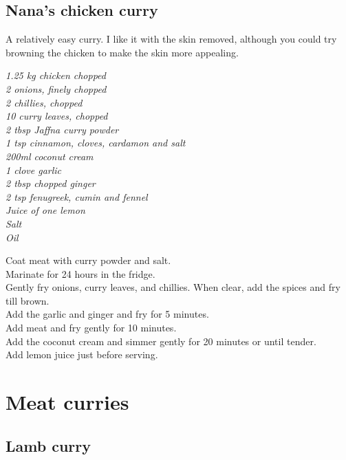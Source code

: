 \documentclass{tufte-book}
\begin{document}

\section{Nana's chicken curry}

A relatively easy curry. I like it with the skin removed, although you could try browning the chicken to make the skin more appealing.

\smallskip
\emph{1.25 kg chicken chopped
\\2 onions, finely chopped
\\2 chillies, chopped
\\10 curry leaves, chopped
\\2 tbsp Jaffna curry powder
\\1 tsp cinnamon, cloves, cardamon and salt
\\200ml coconut cream
\\1 clove garlic
\\2 tbsp chopped ginger
\\2 tsp fenugreek, cumin and fennel
\\Juice of one lemon
\\Salt
\\Oil}

\smallskip
Coat meat with curry powder and salt. 
\\Marinate for 24 hours in the fridge.
\\Gently fry onions, curry leaves, and chillies. When clear, add the spices and fry till brown.
\\Add the garlic and ginger and fry for 5 minutes.
\\Add meat and fry gently for 10 minutes.
\\Add the coconut cream and simmer gently for 20 minutes or until tender.
\\Add lemon juice just before serving.

\chapter{Meat curries}

\section{Lamb curry}
\end{document}

